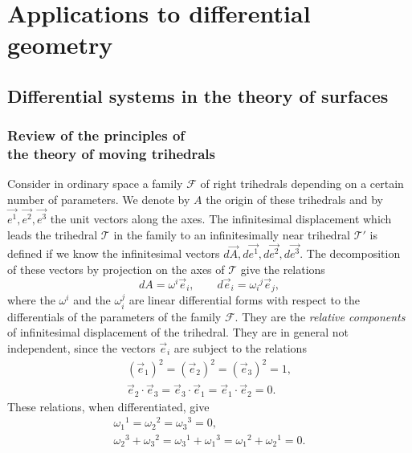 \documentclass[leqno,11pt]{book}
\numberwithin{equation}{chapter}
\theoremstyle{shape1}
\theoremstyle{shape0}
\theoremstyle{shape2}
\theoremstyle{definition}
\begin{document}
\setcounter{frenchsec}{1}
\part{Applications to differential geometry}
\label{part:appl-diff-geom}

\chapter{Differential systems in the theory of surfaces}
\label{cha:diff-syst-theory}

\section[{Review of the principles of the theory of moving trihedrals}]{Review of the principles of\\the theory of moving trihedrals}
\label{sec:revi-princ-theory}

\fsec Consider in ordinary space a family $\mathcal{F}$ of right trihedrals depending on a certain number of parameters. We denote by $A$ the origin of these trihedrals and by $\vec{e^{1}},\vec{e^{2}},\vec{e^{3}}$ the unit vectors along the axes. The infinitesimal displacement which leads the trihedral $\mathcal{T}$ in the family to an infinitesimally near trihedral $\mathcal{T}'$ is defined if we know the infinitesimal vectors $d\vec{A},d\vec{e^{1}},d\vec{e^{2}},d\vec{e^{3}}$. The decomposition of these vectors by projection on the axes of $\mathcal{T}$ give the relations
\begin{equation}
  \label{eq:7.1}
  dA=\omega^{i}\vec e_{i},\qquad d\vec e_{i}=\omega_{i}{}^{j}\vec e_{j},
\end{equation}
where the $\omega^{i}$ and the $\omega_{i}^{j}$ are linear differential forms with respect to the differentials of the parameters of the family $\mathcal{F}$. They are the \emph{relative components} of infinitesimal displacement of the trihedral. They are in general not independent, since the vectors $\vec e_{i}$ are subject to the relations
\begin{gather*}
  (\vec e_{1})^{2}=(\vec e_{2})^{2}=(\vec e_{3})^{2}=1,\\
  \vec e_{2}\cdot\vec e_{3}=\vec e_{3}\cdot\vec e_{1}=\vec e_{1}\cdot \vec e_{2}=0.
\end{gather*}
These relations, when differentiated, give
\begin{gather*}
  \omega_{1}{}^{1}=\omega_{2}{}^{2}=\omega_{3}{}^{3}=0,\\
  \omega_{2}{}^{3}+\omega_{3}{}^{2}=\omega_{3}{}^{1}+\omega_{1}{}^{3}=\omega_{1}{}^{2}+\omega_{2}{}^{1}=0.
\end{gather*}
\end{document}
